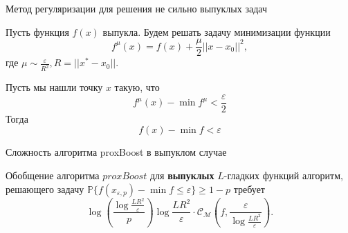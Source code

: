\documentclass{beamer}
\newcommand{\e}{\varepsilon}
\begin{document}
\begin{frame}{Метод регуляризации для решения не сильно выпуклых задач}
\begin{theorem}
    Пусть функция $f(x)$ выпукла. Будем решать задачу минимизации функции \[f^{\mu}(x) = f(x) + \frac{\mu}{2} ||x - x_0||^2,\] где $\mu \sim \frac{\e}{R^2}, R = ||x^* - x_0||$.

    Пусть мы нашли точку $x$ такую, что
    \[f^{\mu}(x) - \min f^{\mu} < \frac{\e}{2}\]
    Тогда 
    \[f(x) - \min f < \e\]
\end{theorem}
\end{frame}

\begin{frame}{Сложность алгоритма proxBoost в выпуклом случае}
\begin{theorem}
    Обобщение алгоритма $proxBoost$ для \textbf{выпуклых} $L$-гладких функций алгоритм, решающего задачу $\mathds{P} \{f(x_{\e, p})-\min f \le \e\} \ge 1 - p$ требует \[\log({\frac{\log{\frac{LR^2}{\e}}}{p}})\log{\frac{LR^2}{\e}}\cdot \mathcal{C}_{\mathcal{M}}(f, \frac{\e}{\log{\frac{LR^2}{\e}}}).\] 
\end{theorem}


\end{frame}








\end{document}
